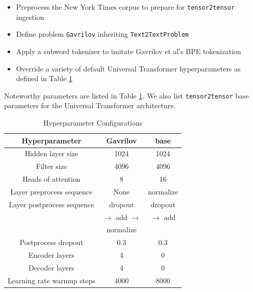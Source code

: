 \documentclass[11pt]{article}
\begin{document}
\begin{itemize}
    \item Preprocess the New York Times corpus to prepare for \texttt{tensor2tensor} ingestion
    \item Define problem \texttt{Gavrilov} inheriting \texttt{Text2TextProblem}
    \item Apply a subword tokenizer to imitate Gavrilov et al's BPE tokenization
    \item Override a variety of default Universal Transformer hyperparameters as defined in Table \ref{table:hparams}
\end{itemize}

Noteworthy parameters are listed in Table \ref{table:hparams}. We also list \texttt{tensor2tensor} base parameters for the Universal Transformer architecture.

\begin{table}[h!]
\centering
\begin{small}
\begin{tabular}{|c |c |c|} 
 \hline
 Hyperparameter & Gavrilov & base \\ [0.5ex] 
 \hline
 Hidden layer size & 1024 & 1024 \\ 
 Filter size & 4096 & 4096 \\
 Heads of attention & 8 & 16 \\
 Layer preprocess sequence & None & normalize \\
 Layer postprocess sequence & dropout & dropout \\
 & $\rightarrow$ add $\rightarrow$ & $\rightarrow$ add \\
 & normalize & \\
 Postprocess dropout & 0.3 & 0.3 \\
 Encoder layers & 4 & 0 \\
 Decoder layers & 4 & 0 \\
 Learning rate warmup steps & 4000 & 8000 \\ [1ex]
 \hline
\end{tabular}
\end{small}
\caption{Hyperparameter Configurations}
\label{table:hparams}
\end{table}
\end{document}
